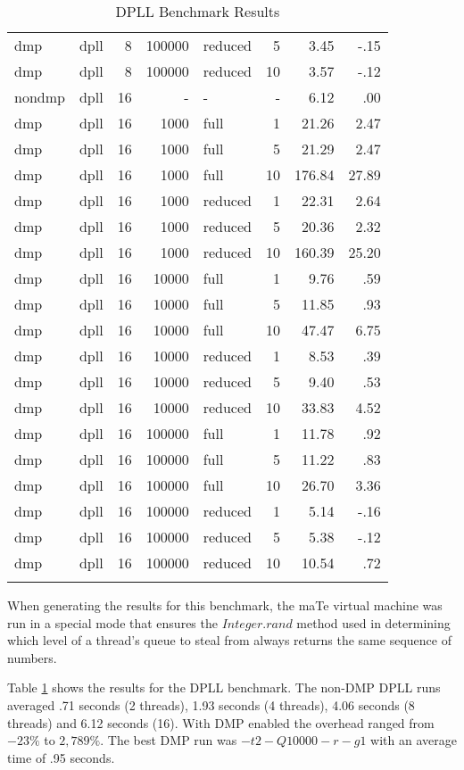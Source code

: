 \begin{center}
\begin{small}
\begin{longtable}{llrrlrrr}
dmp & dpll & 8 & 100000 & reduced & 5 & 3.45 & -.15\\
dmp & dpll & 8 & 100000 & reduced & 10 & 3.57 & -.12\\
\hline
nondmp & dpll & 16 & - & - & - & 6.12 & .00\\
dmp & dpll & 16 & 1000 & full & 1 & 21.26 & 2.47\\
dmp & dpll & 16 & 1000 & full & 5 & 21.29 & 2.47\\
dmp & dpll & 16 & 1000 & full & 10 & 176.84 & 27.89\\
dmp & dpll & 16 & 1000 & reduced & 1 & 22.31 & 2.64\\
dmp & dpll & 16 & 1000 & reduced & 5 & 20.36 & 2.32\\
dmp & dpll & 16 & 1000 & reduced & 10 & 160.39 & 25.20\\
dmp & dpll & 16 & 10000 & full & 1 & 9.76 & .59\\
dmp & dpll & 16 & 10000 & full & 5 & 11.85 & .93\\
dmp & dpll & 16 & 10000 & full & 10 & 47.47 & 6.75\\
dmp & dpll & 16 & 10000 & reduced & 1 & 8.53 & .39\\
dmp & dpll & 16 & 10000 & reduced & 5 & 9.40 & .53\\
dmp & dpll & 16 & 10000 & reduced & 10 & 33.83 & 4.52\\
dmp & dpll & 16 & 100000 & full & 1 & 11.78 & .92\\
dmp & dpll & 16 & 100000 & full & 5 & 11.22 & .83\\
dmp & dpll & 16 & 100000 & full & 10 & 26.70 & 3.36\\
dmp & dpll & 16 & 100000 & reduced & 1 & 5.14 & -.16\\
dmp & dpll & 16 & 100000 & reduced & 5 & 5.38 & -.12\\
dmp & dpll & 16 & 100000 & reduced & 10 & 10.54 & .72\\
\hline
\caption{DPLL Benchmark Results}
\label{tab:dpll_results}
\end{longtable}
\end{small}
\end{center}

When generating the results for this benchmark, the maTe virtual
machine was run in a special mode that ensures the $Integer.rand$
method used in determining which level of a thread's queue to steal
from always returns the same sequence of numbers.

Table \ref{tab:dpll_results} shows the results for the DPLL benchmark.
The non-DMP DPLL runs averaged .71 seconds (2 threads), 1.93 seconds
(4 threads), 4.06 seconds (8 threads) and 6.12 seconds (16).  With DMP
enabled the overhead ranged from $-23\%$ to $2,789\%$.  The best DMP
run was $-t2 -Q10000 -r -g1$ with an average time of .95 seconds.

